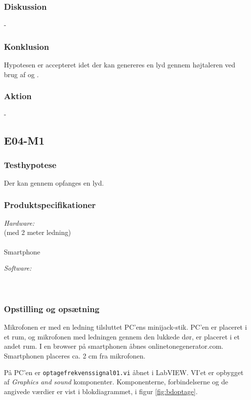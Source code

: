 		\subsubsection{Diskussion} 
		-
		\subsubsection{Konklusion}
		Hypotesen er accepteret idet der kan genereres en lyd gennem højtaleren ved brug af \arduino{} og \labview. 
		
		\subsubsection{Aktion}
		- 
		
		\subsection{E04-M1}
		\label{subsec:E04}
		\subsubsection{Testhypotese}
		Der kan gennem \mikrofon opfanges en lyd. 
		
		\subsubsection{Produktspecifikationer}
	
			\textit{Hardware:}\\
			\mikrofon{} (med 2 meter ledning)\\
			\PC\\
			Smartphone 
	
			\textit{Software:}\\
			\labview\\
			\onlineg\\
	
		\subsubsection{Opstilling og opsætning}
		Mikrofonen er med en ledning tilsluttet PC'ens minijack-stik. PC'en er placeret i et rum, og mikrofonen med ledningen gennem den lukkede dør, er placeret i et andet rum. I en browser på smartphonen åbnes onlinetonegenerator.com. Smartphonen placeres ca. 2 cm fra mikrofonen. 
	
			På PC'en er \texttt{optagefrekvenssignal01.vi} åbnet i LabVIEW. VI'et er opbygget af \textit{Graphics and sound} komponenter. Komponenterne, forbindelserne og de angivede værdier er vist i blokdiagrammet, i figur \ref{fig:bdoptage}.   \\    
	
